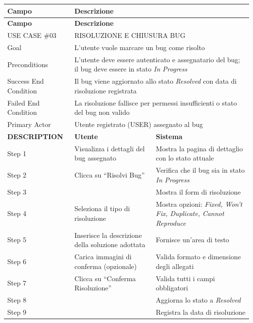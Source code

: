 \begin{longtable}{|p{3cm}|p{7cm}|p{5.5cm}|}
\hline
\textbf{Campo} & \multicolumn{2}{p{12.5cm}|}{\textbf{Descrizione}} \\
\hline
\endfirsthead
\hline
\textbf{Campo} & \multicolumn{2}{p{12.5cm}|}{\textbf{Descrizione}} \\
\hline
\endhead
\hline
\endfoot
\hline
\endlastfoot

USE CASE \#03 & \multicolumn{2}{p{12.5cm}|}{RISOLUZIONE E CHIUSURA BUG} \\
\hline
Goal & \multicolumn{2}{p{12.5cm}|}{L'utente vuole marcare un bug come risolto} \\
\hline
Preconditions & \multicolumn{2}{p{12.5cm}|}{L'utente deve essere autenticato e assegnatario del bug; il bug deve essere in stato \textit{In Progress}} \\
\hline
Success End Condition & \multicolumn{2}{p{12.5cm}|}{Il bug viene aggiornato allo stato \textit{Resolved} con data di risoluzione registrata} \\
\hline
Failed End Condition & \multicolumn{2}{p{12.5cm}|}{La risoluzione fallisce per permessi insufficienti o stato del bug non valido} \\
\hline
Primary Actor & \multicolumn{2}{p{12.5cm}|}{Utente registrato (USER) assegnato al bug} \\
\hline\hline
\textbf{DESCRIPTION} & \textbf{Utente} & \textbf{Sistema} \\
\hline
Step 1 & Visualizza i dettagli del bug assegnato & Mostra la pagina di dettaglio con lo stato attuale \\
\hline
Step 2 & Clicca su ``Risolvi Bug'' & Verifica che il bug sia in stato \textit{In Progress} \\
\hline
Step 3 & & Mostra il form di risoluzione \\
\hline
Step 4 & Seleziona il tipo di risoluzione & Mostra opzioni: \textit{Fixed, Won't Fix, Duplicate, Cannot Reproduce} \\
\hline
Step 5 & Inserisce la descrizione della soluzione adottata & Fornisce un'area di testo \\
\hline
Step 6 & Carica immagini di conferma (opzionale) & Valida formato e dimensione degli allegati \\
\hline
Step 7 & Clicca su ``Conferma Risoluzione'' & Valida tutti i campi obbligatori \\
\hline
Step 8 & & Aggiorna lo stato a \textit{Resolved} \\
\hline
Step 9 & & Registra la data di risoluzione \\

\end{longtable}
